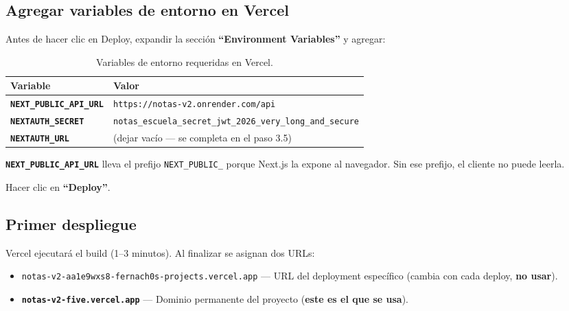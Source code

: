 \documentclass[12pt, a4paper]{article}
\newcommand{\cmd}[1]{\texttt{#1}}
\newcommand{\var}[1]{\texttt{\textbf{#1}}}
\begin{document}
\subsection{Agregar variables de entorno en Vercel}

Antes de hacer clic en Deploy, expandir la sección \textbf{``Environment Variables''} y agregar:

\begin{table}[H]
    \centering
    \begin{tabular}{p{5cm} p{8cm}}
        \toprule
        \textbf{Variable} & \textbf{Valor} \\
        \midrule
        \var{NEXT\_PUBLIC\_API\_URL} & \cmd{https://notas-v2.onrender.com/api} \\[0.2cm]
        \var{NEXTAUTH\_SECRET}       & \cmd{notas\_escuela\_secret\_jwt\_2026\_very\_long\_and\_secure} \\[0.2cm]
        \var{NEXTAUTH\_URL}          & (dejar vacío --- se completa en el paso 3.5) \\
        \bottomrule
    \end{tabular}
    \caption{Variables de entorno requeridas en Vercel.}
\end{table}

\begin{nota}
    \var{NEXT\_PUBLIC\_API\_URL} lleva el prefijo \cmd{NEXT\_PUBLIC\_} porque Next.js la expone al navegador. Sin ese prefijo, el cliente no puede leerla.
\end{nota}

Hacer clic en \textbf{``Deploy''}.

\subsection{Primer despliegue}

Vercel ejecutará el build (1--3 minutos). Al finalizar se asignan dos URLs:

\begin{itemize}
    \item \cmd{notas-v2-aa1e9wxs8-fernach0s-projects.vercel.app} --- URL del deployment específico (cambia con cada deploy, \textbf{no usar}).
    \item \textbf{\cmd{notas-v2-five.vercel.app}} --- Dominio permanente del proyecto (\textbf{este es el que se usa}).
\end{itemize}
\end{document}
